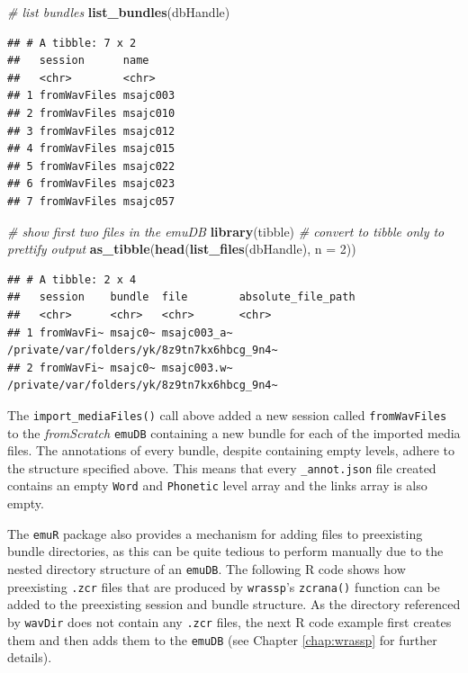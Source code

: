 \documentclass[]{book}
\newenvironment{Shaded}{\begin{snugshade}}{\end{snugshade}}
\newcommand{\CommentTok}[1]{\textcolor[rgb]{0.56,0.35,0.01}{\textit{#1}}}
\newcommand{\DataTypeTok}[1]{\textcolor[rgb]{0.13,0.29,0.53}{#1}}
\newcommand{\DecValTok}[1]{\textcolor[rgb]{0.00,0.00,0.81}{#1}}
\newcommand{\KeywordTok}[1]{\textcolor[rgb]{0.13,0.29,0.53}{\textbf{#1}}}
\newcommand{\NormalTok}[1]{#1}
\begin{document}
\begin{Shaded}
\begin{Highlighting}[]
\CommentTok{# list bundles}
\KeywordTok{list_bundles}\NormalTok{(dbHandle)}
\end{Highlighting}
\end{Shaded}

\begin{verbatim}
## # A tibble: 7 x 2
##   session      name    
##   <chr>        <chr>   
## 1 fromWavFiles msajc003
## 2 fromWavFiles msajc010
## 3 fromWavFiles msajc012
## 4 fromWavFiles msajc015
## 5 fromWavFiles msajc022
## 6 fromWavFiles msajc023
## 7 fromWavFiles msajc057
\end{verbatim}

\begin{Shaded}
\begin{Highlighting}[]
\CommentTok{# show first two files in the emuDB}
\KeywordTok{library}\NormalTok{(tibble) }\CommentTok{# convert to tibble only to prettify output}
\KeywordTok{as_tibble}\NormalTok{(}\KeywordTok{head}\NormalTok{(}\KeywordTok{list_files}\NormalTok{(dbHandle), }\DataTypeTok{n =} \DecValTok{2}\NormalTok{))}
\end{Highlighting}
\end{Shaded}

\begin{verbatim}
## # A tibble: 2 x 4
##   session    bundle  file        absolute_file_path                        
##   <chr>      <chr>   <chr>       <chr>                                     
## 1 fromWavFi~ msajc0~ msajc003_a~ /private/var/folders/yk/8z9tn7kx6hbcg_9n4~
## 2 fromWavFi~ msajc0~ msajc003.w~ /private/var/folders/yk/8z9tn7kx6hbcg_9n4~
\end{verbatim}

The \texttt{import\_mediaFiles()} call above added a new session called \texttt{fromWavFiles} to the \emph{fromScratch} \texttt{emuDB} containing a new bundle for each of the imported media files. The annotations of every bundle, despite containing empty levels, adhere to the structure specified above. This means that every \texttt{\_annot.json} file created contains an empty \texttt{Word} and \texttt{Phonetic} level array and the links array is also empty.

The \texttt{emuR} package also provides a mechanism for adding files to preexisting bundle directories, as this can be quite tedious to perform manually due to the nested directory structure of an \texttt{emuDB}. The following R code shows how preexisting \texttt{.zcr} files that are produced by \texttt{wrassp}'s \texttt{zcrana()} function can be added to the preexisting session and bundle structure. As the directory referenced by \texttt{wavDir} does not contain any \texttt{.zcr} files, the next R code example first creates them and then adds them to the \texttt{emuDB} (see Chapter \ref{chap:wrassp} for further details).
\end{document}
